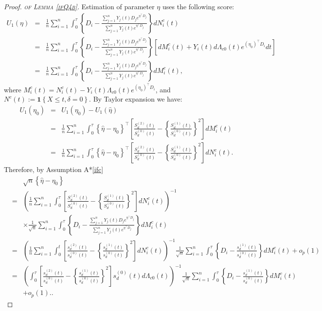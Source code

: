 \documentclass[11pt]{article}
\newcommand{\ee}{\end{eqnarray}}
\newcommand{\eqnn}{\begin{eqnarray*}}
\newcommand{\een}{\end{eqnarray*}}
\newcommand{\be}{\begin{eqnarray}}
\begin{document}
\newenvironment{newproof14}{\begin{proof}\textsc{\emph{of Lemma \ref{ifQ4b}.}}}{\end{proof}}

\begin{newproof14}
Estimation of parameter $\eta$ uses the following score:
\eqnn
U_1(\eta)&=&\frac{1}{n}\sum_{i=1}^n\int_0^\tau \left\{D_i-\frac{\sum_{j=1}^nY_j(t)D_je^{\eta^\top D_j}}{\sum_{j=1}^nY_j(t)e^{\eta^\top D_j}}\right\}dN^c_i(t)\\
&=&\frac{1}{n}\sum_{i=1}^n\int_0^\tau \left\{D_i-\frac{\sum_{j=1}^nY_j(t)D_je^{\eta^\top D_j}}{\sum_{j=1}^nY_j(t)e^{\eta^\top D_j}}\right\}\left[dM^c_i(t)+Y_i(t)d\Lambda_{c0}(t)e^{(\eta_0)^\top D_i}dt\right]\\
&=&\frac{1}{n}\sum_{i=1}^n\int_0^\tau \left\{D_i-\frac{\sum_{j=1}^nY_j(t)D_je^{\eta^\top D_j}}{\sum_{j=1}^nY_j(t)e^{\eta^\top D_j}}\right\}dM^c_i(t),
\een
where 
$M^c_i(t)=N_i^c(t)-Y_i(t)\Lambda_{c0}(t)e^{(\eta_0)^\top D_i}$,
and
$N^c(t):=\mathbf{1}\left\{X\leq t, \delta=0\right\}$.
By Taylor expansion we have:
\eqnn
U_1(\eta_0)&=&U_1(\eta_0)-U_1(\hat\eta)\\
&=&\frac{1}{n}\sum_{i=1}^n\int_0^\tau \left\{\hat\eta-\eta_0\right\}^\top\left[\frac{S_d^{(2)}(t)}{S_d^{(0)}(t)}-\left\{\frac{S_d^{(1)}(t)}{S_d^{(0)}(t)}\right\}^2\right]dM^c_i(t)\\
&=&\frac{1}{n}\sum_{i=1}^n\int_0^\tau \left\{\hat\eta-\eta_0\right\}^\top\left[\frac{S_d^{(2)}(t)}{S_d^{(0)}(t)}-\left\{\frac{S_d^{(1)}(t)}{S_d^{(0)}(t)}\right\}^2\right]dN^c_i(t).
\een
Therefore, by Assumption A*\ref{ifc}
\be\label{2if}
&&\sqrt{n}\left\{\hat\eta-\eta_0\right\}\\&=&\left(\frac{1}{n}\sum_{i=1}^n\int_0^\tau\left[\frac{S_d^{(2)}(t)}{S_d^{(0)}(t)}-\left\{\frac{S_d^{(1)}(t)}{S_d^{(0)}(t)}\right\}^2\right]dN^c_i(t)\right)^{-1}\nonumber\\
&&\times\frac{1}{\sqrt{n}}\sum_{i=1}^n\int_0^\tau \left\{D_i-\frac{\sum_{j=1}^nY_j(t)D_je^{\eta^\top D_j}}{\sum_{j=1}^nY_j(t)e^{\eta^\top D_j}}\right\}dM^c_i(t)\nonumber\\
&=&\left(\frac{1}{n}\sum_{i=1}^n\int_0^t \left[\frac{s_d^{(2)}(t)}{s_d^{(0)}(t)}-\left\{\frac{s_d^{(1)}(t)}{s_d^{(0)}(t)}\right\}^2\right]dN^c_i(t)\right)^{-1}\frac{1}{\sqrt{n}}\sum_{i=1}^n\int_0^\tau \left\{D_i-\frac{s_d^{(1)}(t)}{s_d^{(0)}(t)}\right\}dM^c_i(t)+o_p(1)\nonumber\\
&=&\left(\int_0^\tau\left[\frac{s_d^{(2)}(t)}{s_d^{(0)}(t)}-\left\{\frac{s_d^{(1)}(t)}{s_d^{(0)}(t)}\right\}^2\right]s_d^{(0)}(t)d\Lambda_{c0}(t)\right)^{-1}\frac{1}{\sqrt{n}}\sum_{i=1}^n\int_0^\tau \left\{D_i-\frac{s_d^{(1)}(t)}{s_d^{(0)}(t)}\right\}dM^c_i(t)\nonumber\\&&+o_p(1).\nonumber.
\ee



\end{newproof14}
\end{document}
